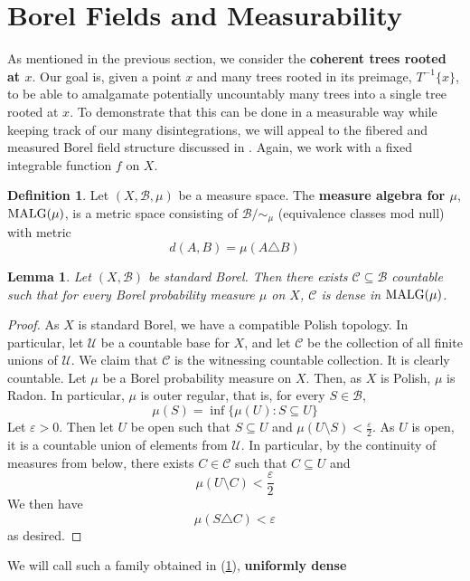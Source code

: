 \documentclass{article}
\newcommand{\malg}[1]{\textmd{MALG}(#1)}
\let\oldref\ref
\renewcommand{\ref}[1]{(\oldref{#1})}
\newtheorem{lemma}[theorem]{Lemma}
\theoremstyle{definition}
\newtheorem{definition}[theorem]{Definition}
\begin{document}
\section{Borel Fields and Measurability}
As mentioned in the previous section, we consider the \textbf{ coherent trees rooted at $  x$}. Our goal is, given a point $ x $ and many trees rooted in its preimage, $ T^{-1}\{x\} $, to be able to amalgamate potentially uncountably many trees into a single tree rooted at $ x $. To demonstrate that this can be done in a measurable way while keeping track of our many disintegrations, we will appeal to the fibered and measured Borel field structure discussed in \cite{borelfieldpaper}. Again, we work with a fixed integrable function $ f $ on $ X$.
\begin{definition}
    Let $ (X,\mathcal{B},\mu) $ be a measure space. The \textbf{measure algebra for $ \mu $}, $\malg{\mu} $, is a metric space consisting of $ \mathcal{B}/\sim_\mu $ (equivalence classes mod null) with metric
    \[
    d(A,B) = \mu(A\triangle B)
    \]
\end{definition}
\begin{lemma}\label{uniformly dense}
    Let $ (X,\mathcal{B}) $ be standard Borel. Then there exists $ \mathcal{C}\subseteq \mathcal{B} $ countable such that for every Borel probability measure $ \mu $ on $ X $, $ \mathcal{C} $ is dense in $ \malg{\mu} $. 
\end{lemma}
\begin{proof}
    As $ X $ is standard Borel, we have a compatible Polish topology. In particular, let $ \mathcal{U} $ be a countable base for $ X $, and let $ \mathcal{C} $ be the collection of all finite unions of $ \mathcal{U} $. We claim that $ \mathcal{C} $ is the witnessing countable collection. It is clearly countable. Let $ \mu $ be a Borel probability measure on $ X $. Then, as $ X $ is Polish, $ \mu $ is Radon. In particular, $ \mu $ is outer regular, that is, for every $ S\in \mathcal{B} $,
    \[
    \mu(S) = \inf\{\mu(U):S\subseteq U\}
    \]
    Let $ \varepsilon > 0 $. Then let $ U $ be open such that $ S\subseteq U $ and $ \mu(U\setminus S)<\frac{\varepsilon}{2} $. As $ U $ is open, it is a countable union of elements from $ \mathcal{U} $. In particular, by the continuity of measures from below, there exists $ C\in \mathcal{C} $ such that $ C\subseteq U $ and
    \[
    \mu(U\setminus C) < \frac{\varepsilon}{2}
    \]
    We then have
    \[
    \mu(S\triangle C)<\varepsilon
    \]
    as desired.
\end{proof}
\noindent We will call such a family obtained in \ref{uniformly dense}, \textbf{uniformly dense}\\\\
\end{document}
